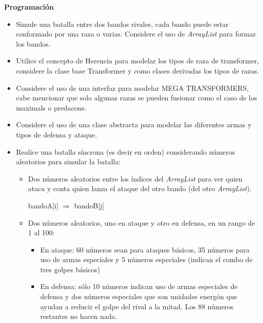 \documentclass[12pt]{article}
\begin{document}
\begin{enumerate}[label = \arabic{enumi}]
    \textbf{Programación}
    \begin{itemize}
      \item Simule una batalla entre dos bandos rivales, cada bando puede estar conformado por una raza o varias. Considere el uso de \textit{ArrayList} para formar los bandos.
      \item Utilice el concepto de Herencia para modelar los tipos de raza de transformer, considere la clase base Transformer y como clases derivadas los tipos de razas.
      \item Considere el uso de una interfaz para modelar MEGA TRANSFORMERS, cabe mencionar que solo algunas razas se pueden fusionar como el caso de los maximals o predacons.
      \item Considere el uso de una clase abstracta para modelar las diferentes armas y tipos de defensa y ataque.
      \item Realice una batalla síncrona (es decir en orden) considerando números aleatorios para simular la batalla:
      \begin{itemize}
        \item Dos números aleatorios entre los índices del \textit{ArrayList} para ver quien ataca y conta quien lanza el ataque del otro bando (del otro \textit{ArrayList}).

        bandoA[i] $\Longrightarrow$ bandoB[j]

        \item Dos números aleatorios, uno en ataque y otro en defensa, en un rango de 1 al 100:
        \begin{itemize}
          \item En ataque: 60 números sean para ataques básicos, 35 números para uso de armas especiales y 5 números especiales (indican el combo de tres golpes básicos)
          \item En defensa: sólo 10 números indican uso de armas especiales de defensa y dos números especiales que son unidades energón que ayudan a reducir el golpe del rival a la mitad. Los 88 números restantes no hacen nada.
        \end{itemize}
      \end{itemize}


\end{itemize}
\end{enumerate}
\end{document}
